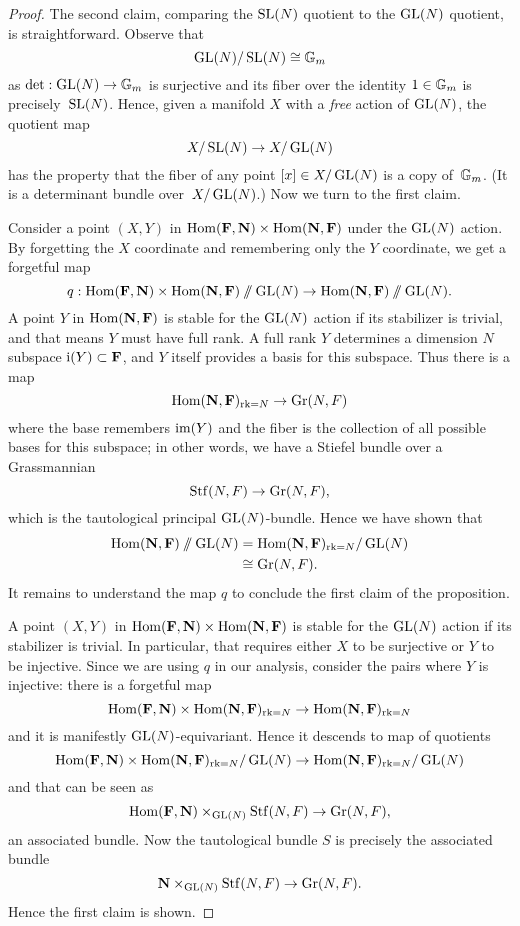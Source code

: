 \documentclass[11pt]{amsart}
\begin{document}
\begin{proof}
The second claim, comparing the $\operatorname{SL}(N)$ quotient to the $\operatorname{GL}(N)$ quotient, is straightforward.
Observe that
\[
\operatorname{GL}(N)/\operatorname{SL}(N) \cong \mathbb G_m
\]
as $\det: \operatorname{GL}(N) \to \mathbb G_m$ is surjective and its fiber over the identity $1 \in \mathbb G_m$ is precisely~$\operatorname{SL}(N)$.
Hence, given a manifold $X$ with a {\em free} action of $\operatorname{GL}(N)$, 
the quotient map
\[
X/\operatorname{SL}(N) \to X/\operatorname{GL}(N)
\]
has the property that the fiber of any point $[x] \in X/\operatorname{GL}(N)$ is a copy of~$\mathbb G_m$.
(It is a determinant bundle over~$X/\operatorname{GL}(N)$.)
Now we turn to the first claim.

Consider a point $(X,Y)$ in ${\rm Hom}(\mathbf F, \mathbf N) \times {\rm Hom}(\mathbf N,\mathbf F)$ under the $\operatorname{GL}(N)$ action.
By forgetting the $X$ coordinate and remembering only the $Y$ coordinate, 
we get a forgetful map
\[
q: {\rm Hom}(\mathbf F, \mathbf N) \times {\rm Hom}(\mathbf N,\mathbf F)\mathbin{/\mkern-6mu/}\operatorname{GL}(N) \to {\rm Hom}(\mathbf N,\mathbf F)\mathbin{/\mkern-6mu/} \operatorname{GL}(N).
\]
A point $Y$ in ${\rm Hom}(\mathbf N,\mathbf F)$ is stable for the $\operatorname{GL}(N)$ action if its stabilizer is trivial,
and that means $Y$ must have full rank.
A full rank $Y$ determines a dimension $N$ subspace $\mathrm{i}(Y) \subset \mathbf F$,
and $Y$ itself provides a basis for this subspace.
Thus there is a map
\[
{\rm Hom}(\mathbf N,\mathbf F)_{\operatorname{rk} = N} \to {\rm Gr}(N,F) 
\]
where the base remembers $\operatorname{im}(Y)$ and the fiber is the collection of all possible bases for this subspace;
in other words, we have a Stiefel bundle over a Grassmannian
\[
\operatorname{Stf}(N,F) \to {\rm Gr}(N,F),
\]
which is the tautological principal $\operatorname{GL}(N)$-bundle.
Hence we have shown that
\begin{align*}
{\rm Hom}(\mathbf N,\mathbf F)\mathbin{/\mkern-6mu/} \operatorname{GL}(N) 
&= {\rm Hom}(\mathbf N,\mathbf F)_{\operatorname{rk} = N}/\operatorname{GL}(N)\\
&\cong {\rm Gr}(N,F).
\end{align*}
It remains to understand the map $q$ to conclude the first claim of the proposition.

A point $(X,Y)$ in ${\rm Hom}(\mathbf F, \mathbf N) \times {\rm Hom}(\mathbf N,\mathbf F)$ is stable for the $\operatorname{GL}(N)$ action if its stabilizer is trivial.
In particular, that requires either $X$ to be surjective or $Y$ to be injective.
Since we are using $q$ in our analysis, consider the pairs where $Y$ is injective:
there is a forgetful map
\[
{\rm Hom}(\mathbf F, \mathbf N) \times {\rm Hom}(\mathbf N,\mathbf F)_{\operatorname{rk} = N} \to {\rm Hom}(\mathbf N,\mathbf F)_{\operatorname{rk} = N}
\]
and it is manifestly $\operatorname{GL}(N)$-equivariant.
Hence it descends to map of quotients
\[
{\rm Hom}(\mathbf F, \mathbf N) \times {\rm Hom}(\mathbf N,\mathbf F)_{\operatorname{rk} = N}/\operatorname{GL}(N) \to {\rm Hom}(\mathbf N,\mathbf F)_{\operatorname{rk} = N}/\operatorname{GL}(N)
\]
and that can be seen as
\[
{\rm Hom}(\mathbf F,\mathbf N) \times_{\operatorname{GL}(N)} \operatorname{Stf}(N,F) \to {\rm Gr}(N,F),
\]
an associated bundle.
Now the tautological bundle $S$ is precisely the associated bundle
\[
\mathbf N \times_{\operatorname{GL}(N)} \operatorname{Stf}(N,F) \to {\rm Gr}(N,F).
\]
Hence the first claim is shown.
\end{proof}
\end{document}
